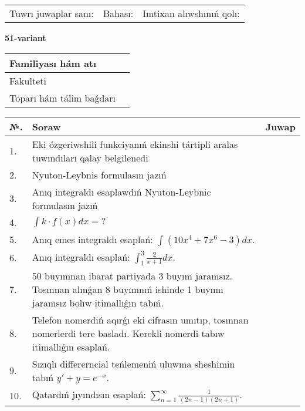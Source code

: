 \documentclass{article}
\begin{document}
\vspace{1cm}

\begin{tabular}{ c c c }
Tuwrı juwaplar sanı: \underline{\hspace{2cm}} & Bahası: \underline{\hspace{2cm}} & Imtixan alıwshınıń qolı: \underline{\hspace{2cm}} \\
\end{tabular}

\newpage

\begin{center}\textbf{51-variant}\end{center}

\bgroup
\def\arraystretch{1.5}
\begin{tabular}{ |m{6cm}|m{10cm}| }
  \hline
  Familiyası hám atı & \\
  \hline
  Fakulteti &\\
  \hline
  Toparı hám tálim baǵdarı & \\
  \hline
\end{tabular}
\egroup

\vspace{0.5cm}

\bgroup
\def\arraystretch{2}
\begin{tabular}{ |l|m{8cm}|m{7cm}| }
  \hline
  №. & Soraw & Juwap \\
  \hline
  1. & Eki ózgeriwshili funkciyanıń ekinshi tártipli aralas tuwındıları qalay belgilenedi &  \\
  \hline
  2. & Nyuton-Leybnis formulasın jazıń &  \\
  \hline
  3. & Anıq integraldı esaplawdıń Nyuton-Leybnic formulasın jazıń &  \\
  \hline
  4. & $\displaystyle\int k \cdot f(x)dx = ?$ &  \\
  \hline
  5. & Anıq emes integraldı esaplań: $\displaystyle\int \left( 10x^{4} + 7x^{6} - 3 \right)dx$. &  \\
  \hline
  6. & Anıq integraldı esaplań: $\displaystyle\int_{1}^{3}{\frac{2}{x + 1}dx}$. &  \\
  \hline
  7. & 50 buyımnan ibarat partiyada 3 buyım jaramsız. Tosınnan alınǵan 8 buyımnıń ishinde 1 buyımı jaramsız bolıw itimallıǵın tabıń. &  \\
  \hline
  8. & Telefon nomerdiń aqırǵı eki cifrasın umıtıp, tosınnan nomerlerdi tere basladı. Kerekli nomerdi tabıw itimallıǵın esaplań. &  \\
  \hline
  9. & Sızıqlı differerncial teńlemeniń uluwma sheshimin tabıń $y' + y =e^{-x}$. &  \\
  \hline
  10. & Qatardıń jıyındısın esaplań: $\displaystyle\sum_{n = 1}^{\infty}\frac{1}{(2n - 1)(2n + 1)}$. &  \\
  \hline
\end{tabular}
\egroup
\end{document}

